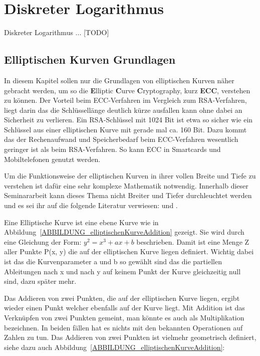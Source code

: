 \section{Diskreter Logarithmus}
	Diskreter Logarithmus ... [TODO]
	
	\subsection{Elliptischen Kurven Grundlagen}\label{Elliptischen Kurven Grundlagen}
		In diesem Kapitel sollen nur die Grundlagen von elliptischen Kurven näher gebracht werden, um so die \textbf{E}lliptic \textbf{C}urve \textbf{C}ryptography, kurz \textbf{ECC}, verstehen zu können. Der Vorteil beim ECC-Verfahren im Vergleich zum RSA-Verfahren, liegt darin das die Schlüssellänge deutlich kürze ausfallen kann ohne dabei an Sicherheit zu verlieren. Ein RSA-Schlüssel mit 1024 Bit ist etwa so sicher wie ein Schlüssel aus einer elliptischen Kurve mit gerade mal ca. 160 Bit. Dazu kommt das der Rechenaufwand und Speicherbedarf beim ECC-Verfahren wesentlich geringer ist als beim RSA-Verfahren. So kann ECC in Smartcards und Mobiltelefonen genutzt werden.\cite{Information:und:Kommunikation}
				
		Um die Funktionsweise der elliptischen Kurven in ihrer vollen Breite und Tiefe zu verstehen ist dafür eine sehr komplexe Mathematik notwendig. Innerhalb dieser Seminararbeit kann dieses Thema nicht Breiter und Tiefer durchleuchtet werden und es sei ihr auf die folgende Literatur verwiesen: \cite{Information:und:Kommunikation} und \cite{Kryptographie:und:IT-Sicherheit}.
		
		Eine Elliptische Kurve ist eine ebene Kurve wie in Abbildung~\ref{ABBILDUNG_elliptischenKurveAddition} gezeigt. Sie wird durch eine Gleichung der Form: $y^2 = x^3 + ax +b$ beschrieben. Damit ist eine Menge Z aller Punkte P(x, y) die auf der elliptischen Kurve liegen definiert. Wichtig dabei ist das die Kurvenparameter a und b so gewählt sind das die partiellen Ableitungen nach x und nach y auf keinem Punkt der Kurve gleichzeitig null sind, dazu später mehr.
		
		Das Addieren von zwei Punkten, die auf der elliptischen Kurve liegen, ergibt wieder einen Punkt welcher ebenfalls auf der Kurve liegt.\cite{Information:und:Kommunikation} Mit Addition ist das Verknüpfen von zwei Punkten gemeint, man könnte es auch als Multiplikation bezeichnen. In beiden fällen hat es nichts mit den bekannten Operationen auf Zahlen zu tun. Das Addieren von zwei Punkten ist vielmehr geometrisch definiert, siehe dazu auch Abbildung~\ref{ABBILDUNG_elliptischenKurveAddition}:
		
